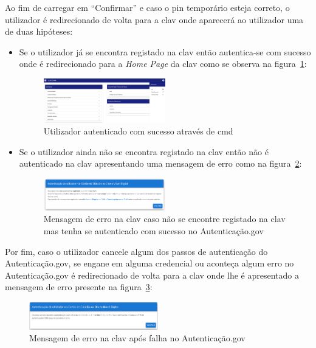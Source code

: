 Ao fim de carregar em ``Confirmar'' e caso o \acrshort{pin} temporário esteja correto, o utilizador é redirecionado de volta para a \acrshort{clav} onde aparecerá ao utilizador uma de duas hipóteses:
\begin{itemize}
    \item Se o utilizador já se encontra registado na \acrshort{clav} então autentica-se com sucesso onde é redirecionado para a \textit{Home Page} da \acrshort{clav} como se observa na figura~\ref{fig:CMDauthSuc}:
    \begin{figure}[H]
        \centering
        \includegraphics[width=0.5\textwidth]{img/CMDauthSuc.png}
        \caption{Utilizador autenticado com sucesso através de \acrshort{cmd}\label{fig:CMDauthSuc}}
    \end{figure}
    \item Se o utilizador ainda não se encontra registado na \acrshort{clav} então não é autenticado na \acrshort{clav} apresentando uma mensagem de erro como na figura~\ref{fig:CMDnotReg}:
    \begin{figure}[H]
        \centering
        \includegraphics[width=0.5\textwidth]{img/CMDnotReg.png}
        \caption{Mensagem de erro na \acrshort{clav} caso não se encontre registado na \acrshort{clav} mas tenha se autenticado com sucesso no Autenticação.gov\label{fig:CMDnotReg}}
    \end{figure}
\end{itemize}

Por fim, caso o utilizador cancele algum dos passos de autenticação do Autenticação.gov, se engane em alguma credencial ou aconteça algum erro no Autenticação.gov é redirecionado de volta para a \acrshort{clav} onde lhe é apresentado a mensagem de erro presente na figura~\ref{fig:CMDerror}:

\begin{figure}[H]
    \centering
    \includegraphics[width=0.5\textwidth]{img/CMDerror.png}
    \caption{Mensagem de erro na \acrshort{clav} após falha no Autenticação.gov\label{fig:CMDerror}}
\end{figure}
